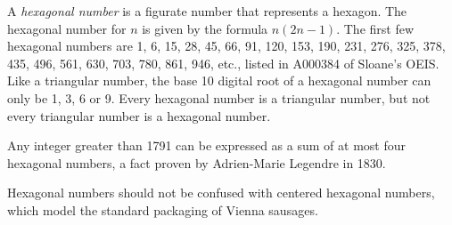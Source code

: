 \documentclass[12pt]{article}
\begin{document}
A {\em hexagonal number} is a figurate number that represents a hexagon. The hexagonal number for $n$ is given by the formula $n(2n - 1)$. The first few hexagonal numbers are
1, 6, 15, 28, 45, 66, 91, 120, 153, 190, 231, 276, 325, 378, 435, 496, 561, 630, 703, 780, 861, 946, etc., listed in A000384 of Sloane's OEIS. Like a triangular number, the base 10 digital root of a hexagonal number can only be 1, 3, 6 or 9. Every hexagonal number is a triangular number, but not every triangular number is a hexagonal number.

Any integer greater than 1791 can be expressed as a sum of at most four hexagonal numbers, a fact proven by Adrien-Marie Legendre in 1830.

Hexagonal numbers should not be confused with centered hexagonal numbers, which model the standard packaging of Vienna sausages.

\end{document}
